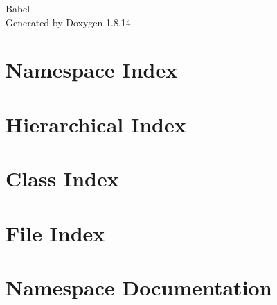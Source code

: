 \documentclass[twoside]{book}
\newcommand{\+}{\discretionary{\mbox{\scriptsize$\hookleftarrow$}}{}{}}
\newcommand{\clearemptydoublepage}{%
  \newpage{\pagestyle{empty}\cleardoublepage}%
}
\begin{document}
\hypersetup{pageanchor=false,
             bookmarksnumbered=true,
             pdfencoding=unicode
            }
\begin{titlepage}
\vspace*{7cm}
\begin{center}%
{\Large Babel }\\
\vspace*{1cm}
{\large Generated by Doxygen 1.8.14}\\
\end{center}
\end{titlepage}
\clearemptydoublepage
{}
\tableofcontents
\clearemptydoublepage
{}
\hypersetup{pageanchor=true}

\chapter{Namespace Index}

\chapter{Hierarchical Index}

\chapter{Class Index}

\chapter{File Index}

\chapter{Namespace Documentation}




\end{document}
